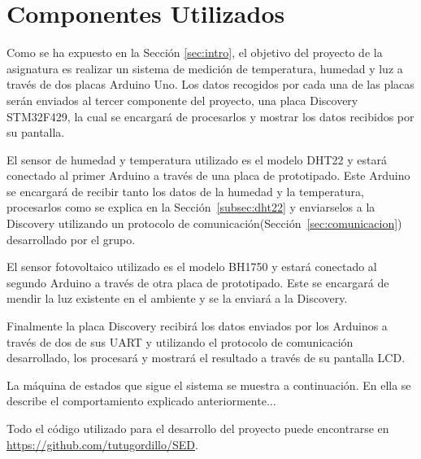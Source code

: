 \section{Componentes Utilizados}\label{sec:arquitectura}

Como se ha expuesto en la Secci\'on \ref{sec:intro}, el objetivo del
proyecto de la asignatura es realizar un sistema de medici\'on de
temperatura, humedad y luz a trav\'es de dos placas Arduino Uno. Los
datos recogidos por cada una de las placas ser\'an enviados al tercer
componente del proyecto, una placa Discovery STM32F429, la cual se
encargar\'a de procesarlos y mostrar los datos recibidos por su
pantalla.

El sensor de humedad y temperatura utilizado es el modelo DHT22 y
estar\'a conectado al primer Arduino a trav\'es de una placa de
prototipado. Este Arduino se encargar\'a de recibir tanto los datos de
la humedad y la temperatura, procesarlos como se explica en la
Secci\'on~\ref{subsec:dht22} y enviarselos a la Discovery utilizando
un protocolo de comunicaci\'on(Secci\'on~\ref{sec:comunicacion}) desarrollado por el grupo.

El sensor fotovoltaico utilizado es el modelo BH1750 y estar\'a
conectado al segundo Arduino a trav\'es de otra placa de
prototipado. Este se encargar\'a de mendir la luz existente en el
ambiente y se la enviar\'a a la Discovery. %

Finalmente la placa Discovery recibir\'a los datos enviados por los
Arduinos a trav\'es de dos de sus UART y utilizando el protocolo de
comunicaci\'on desarrollado, los procesar\'a y mostrar\'a el resultado
a trav\'es de su pantalla LCD.


La m\'aquina de estados que sigue el sistema se muestra a
continuaci\'on. En ella se describe el comportamiento explicado
anteriormente...

Todo el c\'odigo utilizado para el desarrollo del proyecto puede
encontrarse en \url{https://github.com/tutugordillo/SED}.
